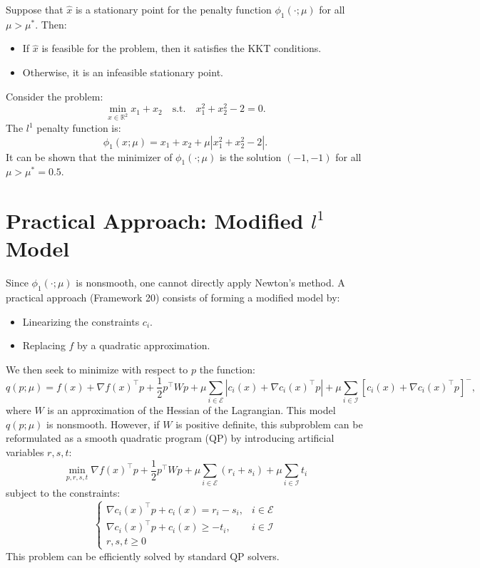 \begin{theoreme}
    Suppose that $\hat{x}$ is a stationary point for the penalty function $\phi_1(\cdot; \mu)$ for all $\mu > \mu^*$.
    Then:
    \begin{itemize}
        \item If $\hat{x}$ is feasible for the problem, then it satisfies the KKT conditions.
        \item Otherwise, it is an infeasible stationary point.
    \end{itemize}
\end{theoreme}

\begin{exemple}
    Consider the problem:
    \[
        \min_{x \in \mathbb{R}^2} x_1 + x_2 \quad \text{s.t.} \quad x_1^2 + x_2^2 - 2 = 0.
    \]
    The $l^1$ penalty function is:
    \[
        \phi_1(x; \mu) = x_1 + x_2 + \mu |x_1^2 + x_2^2 - 2|.
    \]
    It can be shown that the minimizer of $\phi_1(\cdot; \mu)$ is the solution $(-1, -1)$ for all $\mu > \mu^* = 0.5$.
\end{exemple}

\section{Practical Approach: Modified $l^1$ Model}

Since $\phi_1(\cdot; \mu)$ is nonsmooth, one cannot directly apply Newton's method.
A practical approach (Framework 20) consists of forming a modified model by:
\begin{itemize}
    \item Linearizing the constraints $c_i$.
    \item Replacing $f$ by a quadratic approximation.
\end{itemize}
We then seek to minimize with respect to $p$ the function:
\[
    q(p; \mu) = f(x) + \nabla f(x)^\top p + \frac{1}{2} p^\top W p + \mu \sum_{i \in \mathcal{E}} |c_i(x) + \nabla c_i(x)^\top p| + \mu \sum_{i \in \mathcal{I}} [c_i(x) + \nabla c_i(x)^\top p]^-,
\]
where $W$ is an approximation of the Hessian of the Lagrangian.
This model $q(p; \mu)$ is nonsmooth. However, if $W$ is positive definite, this subproblem can be reformulated as a smooth quadratic program (QP) by introducing artificial variables $r, s, t$:
\[
    \min_{p, r, s, t} \nabla f(x)^\top p + \frac{1}{2} p^\top W p + \mu \sum_{i \in \mathcal{E}} (r_i + s_i) + \mu \sum_{i \in \mathcal{I}} t_i
\]
subject to the constraints:
\[
    \begin{cases}
        \nabla c_i(x)^\top p + c_i(x) = r_i - s_i, & i \in \mathcal{E} \\
        \nabla c_i(x)^\top p + c_i(x) \ge -t_i, & i \in \mathcal{I} \\
        r, s, t \ge 0
    \end{cases}
\]
This problem can be efficiently solved by standard QP solvers.

